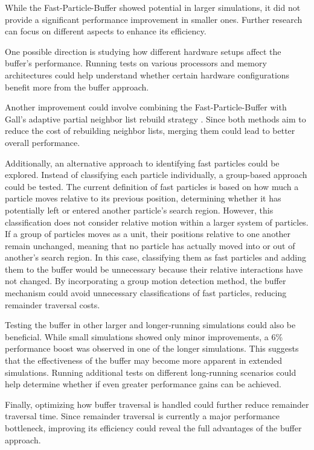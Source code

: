 
While the Fast-Particle-Buffer showed potential in larger simulations, it did not provide a significant performance improvement in smaller ones. Further research can focus on different aspects to enhance its efficiency.

One possible direction is studying how different hardware setups affect the buffer's performance. Running tests on various processors and memory architectures could help understand whether certain hardware configurations benefit more from the buffer approach.

Another improvement could involve combining the Fast-Particle-Buffer with Gall's adaptive partial neighbor list rebuild strategy \parencite{gall2023exploration}. Since both methods aim to reduce the cost of rebuilding neighbor lists, merging them could lead to better overall performance.

Additionally, an alternative approach to identifying fast particles could be explored. Instead of classifying each particle individually, a group-based approach could be tested. The current definition of fast particles is based on how much a particle moves relative to its previous position, determining whether it has potentially left or entered another particle's search region. However, this classification does not consider relative motion within a larger system of particles. If a group of particles moves as a unit, their positions relative to one another remain unchanged, meaning that no particle has actually moved into or out of another's search region. In this case, classifying them as fast particles and adding them to the buffer would be unnecessary because their relative interactions have not changed. By incorporating a group motion detection method, the buffer mechanism could avoid unnecessary classifications of fast particles, reducing remainder traversal costs. 


Testing the buffer in other larger and longer-running simulations could also be beneficial. While small simulations showed only minor improvements, a 6\% performance boost was observed in one of the longer simulations. This suggests that the effectiveness of the buffer may become more apparent in extended simulations. Running additional tests on different long-running scenarios could help determine whether if even greater performance gains can be achieved.

Finally, optimizing how buffer traversal is handled could further reduce remainder traversal time. Since remainder traversal is currently a major performance bottleneck, improving its efficiency could reveal the full advantages of the buffer approach.
